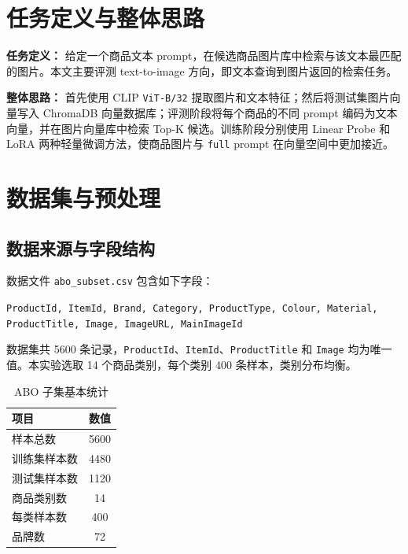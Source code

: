\documentclass[11pt, a4paper]{ctexart}
\begin{document}
\section{任务定义与整体思路}

\textbf{任务定义：} 给定一个商品文本 prompt，在候选商品图片库中检索与该文本最匹配的图片。本文主要评测 text-to-image 方向，即文本查询到图片返回的检索任务。

\textbf{整体思路：} 首先使用 CLIP \texttt{ViT-B/32} 提取图片和文本特征；然后将测试集图片向量写入 ChromaDB 向量数据库；评测阶段将每个商品的不同 prompt 编码为文本向量，并在图片向量库中检索 Top-K 候选。训练阶段分别使用 Linear Probe 和 LoRA 两种轻量微调方法，使商品图片与 \texttt{full} prompt 在向量空间中更加接近。

\section{数据集与预处理}

\subsection{数据来源与字段结构}

数据文件 \texttt{abo\_subset.csv} 包含如下字段：
\begin{center}
\small
\texttt{ProductId, ItemId, Brand, Category, ProductType, Colour, Material, ProductTitle, Image, ImageURL, MainImageId}
\end{center}

数据集共 5600 条记录，\texttt{ProductId}、\texttt{ItemId}、\texttt{ProductTitle} 和 \texttt{Image} 均为唯一值。本实验选取 14 个商品类别，每个类别 400 条样本，类别分布均衡。

\begin{table}[!htbp]
    \centering
    \caption{ABO 子集基本统计}
    \label{tab:dataset-stat}
    \begin{tabular}{lc}
        \toprule
        \textbf{项目} & \textbf{数值} \\
        \midrule
        样本总数 & 5600 \\
        训练集样本数 & 4480 \\
        测试集样本数 & 1120 \\
        商品类别数 & 14 \\
        每类样本数 & 400 \\
        品牌数 & 72 \\
        \bottomrule
    \end{tabular}
\end{table}
\end{document}
